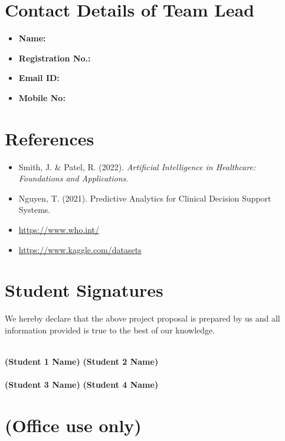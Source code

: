\documentclass[12pt,a4paper]{article}
\begin{document}
\section{Contact Details of Team Lead}
\begin{itemize}
    \item \textbf{Name:}  
    \item \textbf{Registration No.:}  
    \item \textbf{Email ID:} 
    \item \textbf{Mobile No:} 
\end{itemize}

\section{References}
\begin{itemize}
    \item Smith, J. \& Patel, R. (2022). \textit{Artificial Intelligence in Healthcare: Foundations and Applications}.
    \item Nguyen, T. (2021). Predictive Analytics for Clinical Decision Support Systems.
    \item \url{https://www.who.int/}
    \item \url{https://www.kaggle.com/datasets}
\end{itemize}


\vspace{1cm}
\section*{Student Signatures}
\noindent We hereby declare that the above project proposal is prepared by us and all information provided is true to the best of our knowledge.

\vspace{1.5cm}
\noindent\hrulefill \hfill \hrulefill\\
\noindent \textbf{(Student 1 Name)} \hfill \textbf{(Student 2 Name)} \\

\vspace{1.5cm}
\noindent\hrulefill \hfill \hrulefill\\
\noindent \textbf{(Student 3 Name)} \hfill \textbf{(Student 4 Name)} \\


\section*{(Office use only)}
\end{document}
